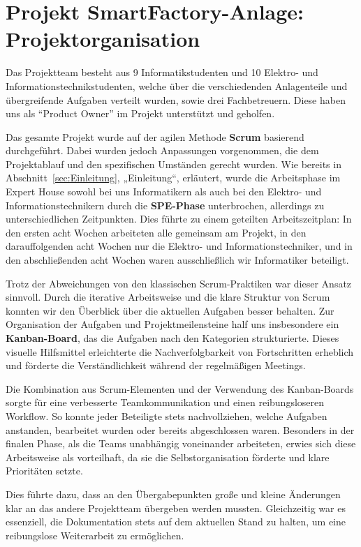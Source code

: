 \section{Projekt SmartFactory-Anlage: Projektorganisation}\label{sec:Projekt SmartFactory-Anlage: Projektorganisation (am ändern)}

Das Projektteam besteht aus 9 Informatikstudenten und 10 Elektro- und Informationstechnikstudenten, welche über die verschiedenden Anlagenteile und übergreifende Aufgaben verteilt wurden,
sowie drei Fachbetreuern. Diese haben uns als ``Product Owner'' im Projekt unterstützt und geholfen.  

Das gesamte Projekt wurde auf der agilen Methode \textbf{Scrum} basierend durchgeführt. Dabei wurden jedoch Anpassungen vorgenommen, die dem 
Projektablauf und den spezifischen Umständen gerecht wurden. Wie bereits in Abschnitt~\ref{sec:Einleitung}, „Einleitung“, erläutert, wurde die 
Arbeitsphase im Expert House sowohl bei uns Informatikern als auch bei den Elektro- und Informationstechnikern durch die \textbf{SPE-Phase} 
unterbrochen, allerdings zu unterschiedlichen Zeitpunkten. Dies führte zu einem geteilten Arbeitszeitplan: In den ersten acht Wochen arbeiteten 
alle gemeinsam am Projekt, in den darauffolgenden acht Wochen nur die Elektro- und Informationstechniker, und in den abschließenden acht Wochen 
waren ausschließlich wir Informatiker beteiligt.

Trotz der Abweichungen von den klassischen Scrum-Praktiken war dieser Ansatz sinnvoll. Durch die iterative Arbeitsweise und die klare Struktur 
von Scrum konnten wir den Überblick über die aktuellen Aufgaben besser behalten. Zur Organisation der Aufgaben und Projektmeilensteine half uns 
insbesondere ein \textbf{Kanban-Board}, das die Aufgaben nach den Kategorien strukturierte. Dieses visuelle 
Hilfsmittel erleichterte die Nachverfolgbarkeit von Fortschritten erheblich und förderte die Verständlichkeit während der regelmäßigen Meetings.

Die Kombination aus Scrum-Elementen und der Verwendung des Kanban-Boards sorgte für eine verbesserte Teamkommunikation und einen reibungsloseren 
Workflow. So konnte jeder Beteiligte stets nachvollziehen, welche Aufgaben anstanden, bearbeitet wurden oder bereits abgeschlossen waren. 
Besonders in der finalen Phase, als die Teams unabhängig voneinander arbeiteten, erwies sich diese Arbeitsweise als vorteilhaft, da sie die 
Selbstorganisation förderte und klare Prioritäten setzte.

Dies führte dazu, dass an den Übergabepunkten große und kleine Änderungen klar an das andere Projektteam übergeben werden mussten.
Gleichzeitig war es essenziell, die Dokumentation stets auf dem aktuellen Stand zu halten, um eine reibungslose Weiterarbeit 
zu ermöglichen.  

